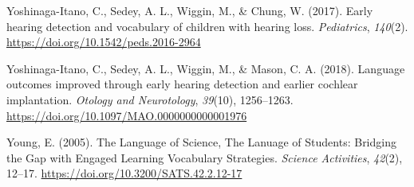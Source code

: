 \documentclass[english,man]{apa6}
\begin{document}
\leavevmode\hypertarget{ref-yoshinaga-itano2017}{}%
Yoshinaga-Itano, C., Sedey, A. L., Wiggin, M., \& Chung, W. (2017). Early hearing detection and vocabulary of children with hearing loss. \emph{Pediatrics}, \emph{140}(2). \url{https://doi.org/10.1542/peds.2016-2964}

\leavevmode\hypertarget{ref-yoshinaga-itano2018}{}%
Yoshinaga-Itano, C., Sedey, A. L., Wiggin, M., \& Mason, C. A. (2018). Language outcomes improved through early hearing detection and earlier cochlear implantation. \emph{Otology and Neurotology}, \emph{39}(10), 1256--1263. \url{https://doi.org/10.1097/MAO.0000000000001976}

\leavevmode\hypertarget{ref-young2005}{}%
Young, E. (2005). The Language of Science, The Lanuage of Students: Bridging the Gap with Engaged Learning Vocabulary Strategies. \emph{Science Activities}, \emph{42}(2), 12--17. \url{https://doi.org/10.3200/SATS.42.2.12-17}
\end{document}
